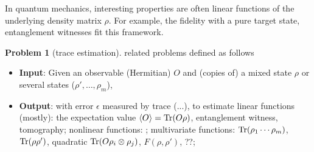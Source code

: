 \documentclass[
reprint,
aps,
pra,
floatfix,
]{revtex4-2}
\theoremstyle{plain}
\theoremstyle{definition}
\newtheorem{problem}{Problem}
\newcommand{\ob}{O}
\newcommand{\dm}{\rho}
\begin{document}
In quantum mechanics, interesting properties are often linear functions of the underlying density matrix $\dm$.
For example, the fidelity with a pure target state, entanglement witnesses fit this framework.
\begin{problem}[trace estimation]\label{prm:trace_estimation}
	related problems defined as follows
	\begin{itemize}
		\item \textbf{Input}: Given an observable (Hermitian) $\ob$ and (copies of) a mixed state $\dm$ or several states ($\dm',\dots,\dm_m$), 
		\item \textbf{Output}: 
		with error $\epsilon$ measured by trace  (...), to estimate
		linear functions (mostly): the expectation value $\expval{\ob}=\Tr(\ob \dm) $, entanglement witness, tomography; 
		nonlinear functions: ;
		multivariate functions:  $\Tr(\dm_1 \cdots \dm_m)$,  $\Tr(\dm\dm')$,  quadratic $\Tr(\ob \dm_i \otimes \dm_j)$,  $F(\dm,\dm')$, ??;
	\end{itemize}
\end{problem}
\end{document}
